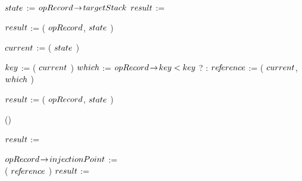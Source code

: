 \begin{limitscope}
\begin{algorithm}[tb]
{   $state$ := $opRecord \!\rightarrow\! targetStack$\;
	 $\result$ := \INADMISSIBLE\;
	 
	 \BlankLine
	
	 \While{$\result$ = \INADMISSIBLE}
	 { 
	    \label{lin:local-seek|modify:while:begin}
      $\result$ := \FindStartPoint( $opRecord$, $state$ )\;
	    \label{lin:local-seek|modify:while:find|start|point}
	    \lIf{$\result$ $\in$ $\{ \STOPFOUND, \STOPNOTFOUND \}$}{ \Break }
			
			\BlankLine
			
      $current$ := \GetTop( $state$ )\;
			\label{lin:local-seek|modify:while:traversal:begin}
	    \While{\True}
	    {
			  
	       $\cKey$ := \GetKey( $current$ )\;
		     $which$ := $opRecord \!\rightarrow\! key < key$ ? \LEFT{} : \RIGHT{}\;
				 \label{lin:local-seek|modify:while:traversal:select}
		     $re\!f\!erence$ := \GetChild( $current$, $which$ )\;
			   		
		     \BlankLine
				
			   {
				    \label{lin:local-seek|modify:while:traversal:stop:begin}
			      \uIf{$\opRecord \rarrow \key$ $<$ $\cKey$}
				    {
				       $\result$ := \FindAdmissible( $opRecord$, $state$ )\;
							 \label{lin:local-seek|modify:while:traversal:find|admissible}
							 
							 
							
				    } \Else()
				    {
						  
							 
							 \label{lin:local-seek|modify:while:traversal:stop}
							
							 $\result$ := \STOPFOUND\;
							 
						   \If{$\opRecord \rarrow \key$ $\neq$ $\cKey$}
							 {
									$opRecord \!\rightarrow\! injectionPoint$ := \\
									\qquad\qquad \GetAddress( $re\!f\!erence$ )\;
							    $\result$ := \STOPNOTFOUND\;
							 }
							
						} 
				   
}}}}
\end{algorithm}
\end{limitscope}
